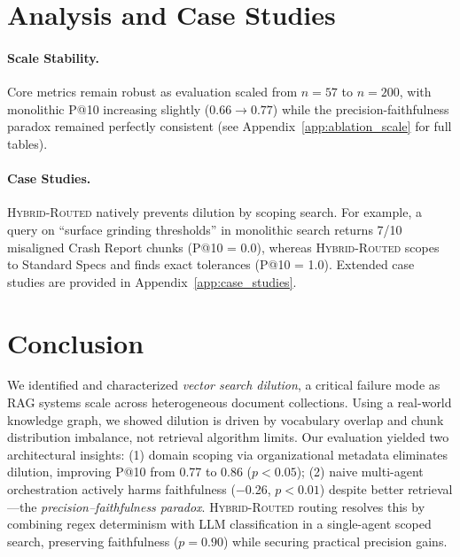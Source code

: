 \documentclass{article}
\newcommand{\hybridname}{\textsc{Hybrid-Routed}}
\begin{document}
\section{Analysis and Case Studies}
\label{sec:analysis_and_case_studies}

\paragraph{Scale Stability.} Core metrics remain robust as evaluation scaled from $n=57$ to $n=200$, with monolithic P@10 increasing slightly ($0.66 \rightarrow 0.77$) while the precision-faithfulness paradox remained perfectly consistent (see Appendix~\ref{app:ablation_scale} for full tables).

\paragraph{Case Studies.} \hybridname{} natively prevents dilution by scoping search. For example, a query on ``surface grinding thresholds'' in monolithic search returns 7/10 misaligned Crash Report chunks (P@10 = 0.0), whereas \hybridname{} scopes to Standard Specs and finds exact tolerances (P@10 = 1.0). Extended case studies are provided in Appendix~\ref{app:case_studies}.

\section{Conclusion}
We identified and characterized \textit{vector search dilution}, a critical failure mode as RAG systems scale across heterogeneous document collections. Using a real-world knowledge graph, we showed dilution is driven by vocabulary overlap and chunk distribution imbalance, not retrieval algorithm limits. Our evaluation yielded two architectural insights: (1) domain scoping via organizational metadata eliminates dilution, improving P@10 from 0.77 to 0.86 ($p < 0.05$); (2) naive multi-agent orchestration actively harms faithfulness ($-$0.26, $p < 0.01$) despite better retrieval---the \textit{precision--faithfulness paradox}. \hybridname{} routing resolves this by combining regex determinism with LLM classification in a single-agent scoped search, preserving faithfulness ($p = 0.90$) while securing practical precision gains.
\end{document}
